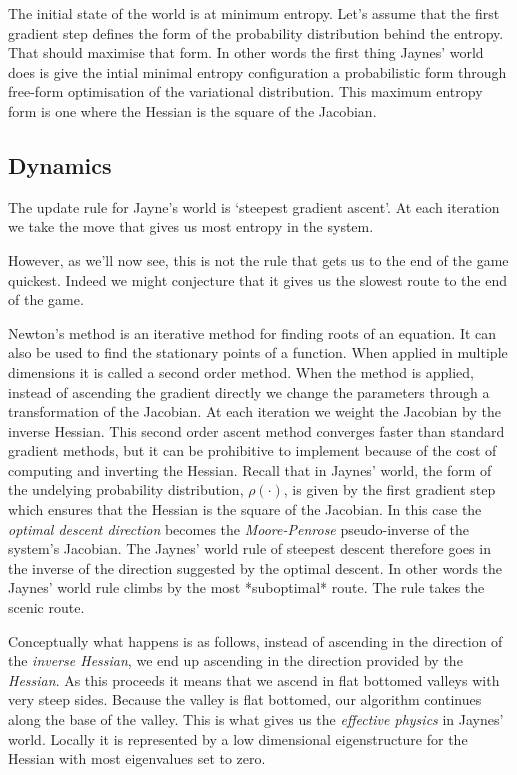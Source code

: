 \documentclass[11pt,a4paper]{article}
\begin{document}
The initial state of the world is at minimum entropy. Let's assume that the first gradient step defines the form of the probability distribution behind the entropy. That should maximise that form. In other words the first thing Jaynes' world does is give the intial minimal entropy configuration a probabilistic form through free-form optimisation of the variational distribution. This maximum entropy form is one where the Hessian is the square of the Jacobian.

\subsection{Dynamics}

The update rule for Jayne's world is `steepest gradient ascent'. At each iteration we take the move that gives us most entropy in the system.

However, as we'll now see, this is not the rule that gets us to the end of the game quickest. Indeed we might conjecture that it gives us the slowest route to the end of the game. 

Newton's method is an iterative method for finding roots of an equation. It can also be used to find the stationary points of a function. When applied in multiple dimensions it is called a second order method. When the method is applied, instead of ascending the gradient directly we change the parameters through a transformation of the Jacobian. At each iteration we weight the Jacobian by the inverse Hessian. This second order ascent method converges faster than standard gradient methods, but it can be prohibitive to implement because of the cost of computing and inverting the Hessian. Recall that in Jaynes' world, the form of the undelying probability distribution, $\rho(\cdot)$, is given by the first gradient step which ensures that the Hessian is the square of the Jacobian. In this case the \emph{optimal descent direction} becomes the \emph{Moore-Penrose} pseudo-inverse of the system's Jacobian. The Jaynes' world rule of steepest descent therefore goes in the inverse of the direction suggested by the optimal descent. In other words the Jaynes' world rule climbs by the most *suboptimal* route. The rule takes the scenic route.

Conceptually what happens is as follows, instead of ascending in the direction of the \emph{inverse Hessian}, we end up ascending in the direction provided by the \emph{Hessian}. As this proceeds it means that we ascend in flat bottomed valleys with very steep sides. Because the valley is flat bottomed, our algorithm continues along the base of the valley. This is what gives us the \emph{effective physics} in Jaynes' world. Locally it is represented by a low dimensional eigenstructure for the Hessian with most eigenvalues set to zero. 
\end{document}
